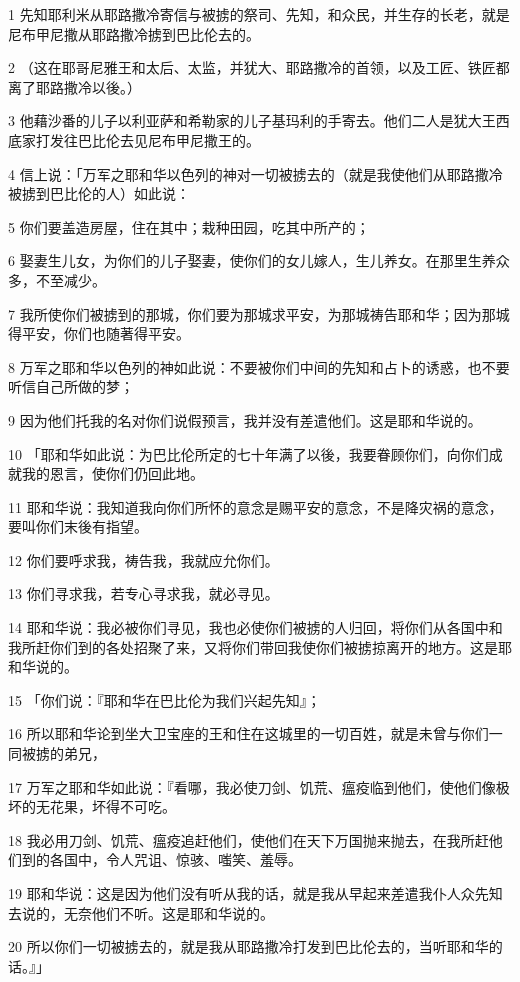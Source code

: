 \par 1 先知耶利米从耶路撒冷寄信与被掳的祭司、先知，和众民，并生存的长老，就是尼布甲尼撒从耶路撒冷掳到巴比伦去的。
\par 2 （这在耶哥尼雅王和太后、太监，并犹大、耶路撒冷的首领，以及工匠、铁匠都离了耶路撒冷以後。）
\par 3 他藉沙番的儿子以利亚萨和希勒家的儿子基玛利的手寄去。他们二人是犹大王西底家打发往巴比伦去见尼布甲尼撒王的。
\par 4 信上说：「万军之耶和华以色列的神对一切被掳去的（就是我使他们从耶路撒冷被掳到巴比伦的人）如此说：
\par 5 你们要盖造房屋，住在其中；栽种田园，吃其中所产的；
\par 6 娶妻生儿女，为你们的儿子娶妻，使你们的女儿嫁人，生儿养女。在那里生养众多，不至减少。
\par 7 我所使你们被掳到的那城，你们要为那城求平安，为那城祷告耶和华；因为那城得平安，你们也随著得平安。
\par 8 万军之耶和华以色列的神如此说：不要被你们中间的先知和占卜的诱惑，也不要听信自己所做的梦；
\par 9 因为他们托我的名对你们说假预言，我并没有差遣他们。这是耶和华说的。
\par 10 「耶和华如此说：为巴比伦所定的七十年满了以後，我要眷顾你们，向你们成就我的恩言，使你们仍回此地。
\par 11 耶和华说：我知道我向你们所怀的意念是赐平安的意念，不是降灾祸的意念，要叫你们末後有指望。
\par 12 你们要呼求我，祷告我，我就应允你们。
\par 13 你们寻求我，若专心寻求我，就必寻见。
\par 14 耶和华说：我必被你们寻见，我也必使你们被掳的人归回，将你们从各国中和我所赶你们到的各处招聚了来，又将你们带回我使你们被掳掠离开的地方。这是耶和华说的。
\par 15 「你们说：『耶和华在巴比伦为我们兴起先知』；
\par 16 所以耶和华论到坐大卫宝座的王和住在这城里的一切百姓，就是未曾与你们一同被掳的弟兄，
\par 17 万军之耶和华如此说：『看哪，我必使刀剑、饥荒、瘟疫临到他们，使他们像极坏的无花果，坏得不可吃。
\par 18 我必用刀剑、饥荒、瘟疫追赶他们，使他们在天下万国抛来抛去，在我所赶他们到的各国中，令人咒诅、惊骇、嗤笑、羞辱。
\par 19 耶和华说：这是因为他们没有听从我的话，就是我从早起来差遣我仆人众先知去说的，无奈他们不听。这是耶和华说的。
\par 20 所以你们一切被掳去的，就是我从耶路撒冷打发到巴比伦去的，当听耶和华的话。』」

